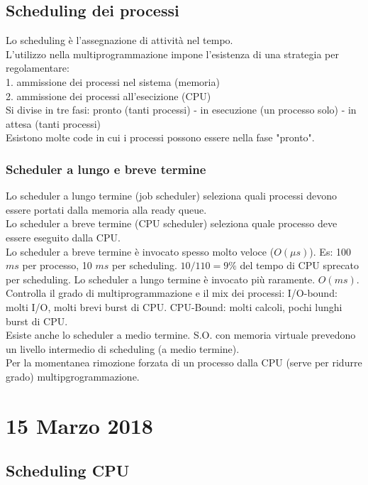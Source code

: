 \documentclass{article}
\begin{document}
\subsection*{Scheduling dei processi}
Lo scheduling \`{e} l'assegnazione di attivit\`{a} nel tempo.\\
L'utilizzo nella multiprogrammazione impone l'esistenza di una strategia per regolamentare:\\
1. ammissione dei processi nel sistema (memoria)\\
2. ammissione dei processi all'esecizione (CPU)\\
Si divise in tre fasi: pronto (tanti processi) - in esecuzione (un processo solo) - in attesa (tanti processi)\\
Esistono molte code in cui i processi possono essere nella fase "pronto".\\
\subsubsection*{Scheduler a lungo e breve termine}
Lo scheduler a lungo termine (job scheduler) seleziona quali
processi devono essere portati dalla memoria alla ready queue.\\
Lo scheduler a breve termine (CPU scheduler) seleziona quale processo
deve essere eseguito dalla CPU.\\
Lo scheduler a breve termine \`{e} invocato spesso molto veloce ($O(\mu s)$).
Es: 100 $ms$ per processo, 10 $ms$ per scheduling. $10/110=9\%$ del tempo
di CPU sprecato per scheduling.
Lo scheduler a lungo termine \`{e} invocato pi\`{u} raramente.
$O(ms)$. Controlla il grado di multiprogrammazione e il mix
dei processi: I/O-bound: molti I/O, molti brevi burst di CPU.
CPU-Bound: molti calcoli, pochi lunghi burst di CPU.\\
Esiste anche lo scheduler a medio termine. S.O. con memoria virtuale prevedono un livello
intermedio di scheduling (a medio termine).\\
Per la momentanea rimozione forzata di un processo dalla CPU (serve per ridurre grado)
multipgrogrammazione.
\section*{15 Marzo 2018}
\subsection*{Scheduling CPU}
\end{document}
